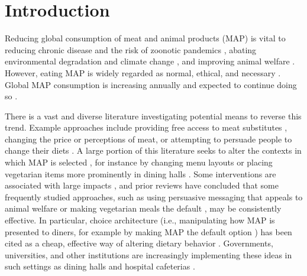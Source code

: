 \documentclass[sn-nature,referee,pdflatex]{sn-jnl}
\begin{document}
\maketitle

\section{Introduction}\label{sec1}

Reducing global consumption of meat and animal products (MAP) is vital
to reducing chronic disease and the risk of zoonotic pandemics
\citep{willett2019, landry2023, hafez2020}, abating environmental
degradation and climate change
\citep{poore2018, koneswaran2008, greger2010}, and improving animal
welfare \citep{kuruc2023, scherer2019}. However, eating MAP is widely
regarded as normal, ethical, and necessary
\citep{piazza2022, milford2019}. Global MAP consumption is increasing
annually \citep{godfray2018} and expected to continue doing so
\citep{whitton2021}.

There is a vast and diverse literature investigating potential means to
reverse this trend. Example approaches include providing free access to
meat substitutes \citep{katare2023}, changing the price
\citep{horgen2002} or perceptions \citep{kunst2016} of meat, or
attempting to persuade people to change their diets
\citep{bianchi2018conscious}. A large portion of this literature seeks
to alter the contexts in which MAP is selected
\citep{bianchi2018restructuring}, for instance by changing menu layouts
\citep{bacon2018, gravert2021} or placing vegetarian items more
prominently in dining halls \citep{ginn2024}. Some interventions are
associated with large impacts
\citep{hansen2021, boronowsky2022, reinders2017}, and prior reviews have
concluded that some frequently studied approaches, such as using
persuasive messaging that appeals to animal welfare
\citep{mathur2021meta} or making vegetarian meals the default
\citep{meier2022}, may be consistently effective. In particular, choice
architecture (i.e., manipulating how MAP is presented to diners, for
example by making MAP the default option \citep{anderson2021}) has been
cited as a cheap, effective way of altering dietary behavior
\citep{colgan2024}. Governments, universities, and other institutions
are increasingly implementing these ideas in such settings as dining
halls \citep{pollicino2024} and hospital cafeterias
\citep{morgenstern2024}.
\end{document}
